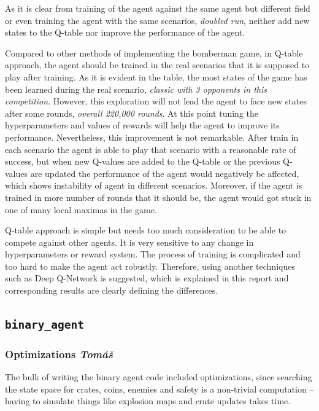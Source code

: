 \documentclass{article}
\begin{document}
As it is clear from training of the agent against the same agent but different field or even training the agent with the same scenarios, \textit{doubled run}, neither add new states to the Q-table nor improve the performance of the agent. 

Compared to other methods of implementing the bomberman game, in Q-table approach, the agent should be trained in the real scenarios that it is supposed to play after training. As it is evident in the table, the most states of the game has been learned during the real scenario, \textit{classic with 3 opponents in this competition}. However, this exploration will not lead the agent to face new states after some rounds, \textit{overall 220,000 rounds}. At this point tuning the hyperparameters and values of rewards will help the agent to improve its performance. Nevertheless, this improvement is not remarkable. After train in each scenario the agent is able to play that scenario with a reasonable rate of success, but when new Q-values are added to the Q-table or the previous Q-values are updated the performance of the agent would negatively be affected, which shows instability of agent in different scenarios. Moreover, if the agent is trained in more number of rounds that it should be, the agent would got stuck in one of many local maximas in the game.

Q-table approach is simple but needs too much consideration to be able to compete against other agents. It is very sensitive to any change in hyperparameters or reward system. The process of training is complicated and too hard to make the agent act robustly. Therefore, using another techniques such as Deep Q-Network is suggested, which is explained in this report and corresponding results are clearly defining the differences.

\clearpage

\subsection[\texttt{binary\_agent}]{\texttt{binary\_agent}}

\subsubsection[Optimizations]{Optimizations {\normalsize \normalfont \it \hfill Tomáš}}

The bulk of writing the binary agent code included optimizations, since searching the state space for crates, coins, enemies and safety is a non-trivial computation -- having to simulate things like explosion maps and crate updates takes time.
\end{document}
